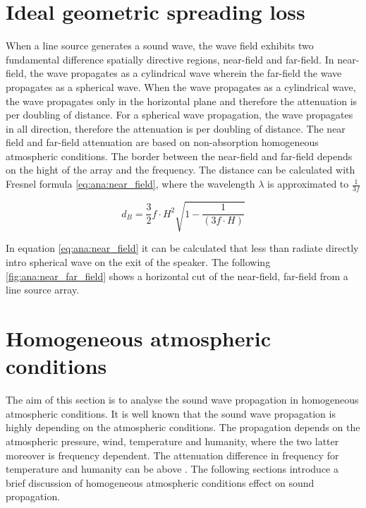 \section{Ideal geometric spreading loss}\label{sec:ana:geo_spr_los}
When a line source generates a sound wave, the wave field exhibits two fundamental difference spatially directive regions, near-field and far-field. In near-field, the wave propagates as a cylindrical wave wherein the far-field the wave propagates as a spherical wave. When the wave propagates as a cylindrical wave, the wave propagates only in the horizontal plane and therefore the attenuation is  per doubling of distance. For a spherical wave propagation, the wave propagates in all direction, therefore the attenuation is  per doubling of distance. The near field and far-field attenuation are based on non-absorption homogeneous atmospheric conditions. The border between the near-field and far-field depends on the hight of the array and the frequency. The distance can be calculated with Fresnel formula \autoref{eq:ana:near_field}, where the wavelength $\lambda$ is approximated to $\frac{1}{3f}$ \citep{bauman2001wavefront}

\begin{equation}\label{eq:ana:near_field}
d_{B} = \frac{3}{2}f \cdot H^{2}\sqrt{1-\frac{1}{(3f \cdot H)}}
\end{equation}

\startexplain
{}
\stopexplain

In equation \autoref{eq:ana:near_field} it can be calculated that less than  radiate directly intro spherical wave on the exit of the speaker. The following \autoref{fig:ana:near_far_field} shows a horizontal cut of the near-field, far-field from a line source array. 


\section{Homogeneous atmospheric conditions}\label{sec:ana:hom_ats_con}
The aim of this section is to analyse the sound wave propagation in homogeneous atmospheric conditions. It is well known that the sound wave propagation is highly depending on the atmospheric conditions. The propagation depends on the atmospheric pressure, wind, temperature and humanity, where the two latter moreover is frequency dependent. The attenuation difference in frequency for temperature and humanity can be above  \citep{corteel2017large}. The following sections introduce a brief discussion of homogeneous atmospheric conditions effect on sound propagation.


